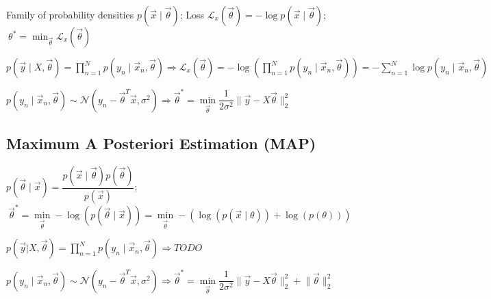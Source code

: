 \documentclass[]{article}
\begin{document}
	Family of probability densities $p(\vec{x}\mid\vec{\theta})$;
	Loss $ \mathcal{L}_x(\vec{\theta}) = - \log p(\vec{x}\mid\vec{\theta})$;
	$\ \theta^* = \min_{\vec{\theta}} \mathcal{L}_x (\vec{\theta})$
	
	$p(\vec{y}\mid X,\vec{\theta})=\prod\limits_{n=1}^N p(y_n\mid\vec{x}_n,\vec{\theta}) \Rightarrow \mathcal{L}_x(\vec{\theta}) = - \log \left(\prod\limits_{n=1}^N p(y_n\mid\vec{x}_n,\vec{\theta})\right) = -\sum\limits_{n=1}^N \log p(y_n\mid\vec{x}_n,\vec{\theta})$
	
	$p(y_n\mid\vec{x}_n,\vec{\theta}) \sim \mathcal{N}(y_n - \vec{\theta}^T\vec{x}, \sigma^2) \Rightarrow \vec{\theta}^* = \min\limits_{\vec{\theta}} \dfrac{1}{2\sigma^2} \lVert\vec{y}-X\vec{\theta}\rVert_2^2$
	
	\subsection{Maximum A Posteriori Estimation (MAP)}
	
	$p(\vec{\theta}\mid\vec{x}) = \dfrac{p(\vec{x}\mid\vec{\theta}) p(\vec{\theta})}{p(\vec{x})}$;	
	$\ \vec{\theta}^* = \min\limits_{\vec{\theta}} -\log(p(\vec{\theta}\mid\vec{x})) =  \min\limits_{\vec{\theta}} - (\log (p(\vec{x}\mid\theta)) + \log(p(\theta)))$
	
	$p(\vec{y}|X,\vec{\theta}) = \prod\limits_{n=1}^N p(y_n\mid\vec{x}_n,\vec{\theta}) \Rightarrow TODO$
	
	$p(y_n\mid\vec{x}_n,\vec{\theta}) \sim \mathcal{N}(y_n - \vec{\theta}^T\vec{x}, \sigma^2) \Rightarrow \vec{\theta}^* = \min\limits_{\vec{\theta}} \dfrac{1}{2\sigma^2} \lVert\vec{y}-X\vec{\theta}\rVert_2^2 
	 + \lVert\vec{\theta}\rVert_2^2$
	
\end{document}
